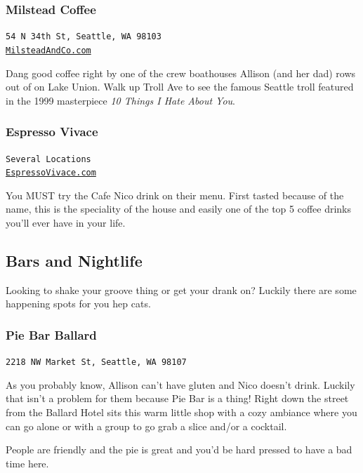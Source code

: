 \documentclass[10pt]{article}
\begin{document}
\subsubsection{Milstead Coffee}
\begin{center}
    \texttt{54 N 34th St, Seattle, WA 98103\\\href{http://milsteadandco.com/}{MilsteadAndCo.com}}
\end{center}
Dang good coffee right by one of the crew boathouses Allison (and her dad) rows out of on Lake Union. 
Walk up Troll Ave to see the famous Seattle troll featured in the 1999 masterpiece \textit{10 Things I Hate About You}.

\subsubsection{Espresso Vivace}
\begin{center}
    \texttt{Several Locations\\\href{http://espressovivace.com/}{EspressoVivace.com}}
\end{center}
You MUST try the Cafe Nico drink on their menu. First tasted because of the name, this is the speciality of 
the house and easily one of the top 5 coffee drinks you'll ever have in your life.

\newpage
\noindent\hrulefill 

\subsection{Bars and Nightlife}
Looking to shake your groove thing or get your drank on? Luckily there are some happening
spots for you hep cats.
\subsubsection{Pie Bar Ballard}
\begin{center}
    \texttt{2218 NW Market St, Seattle, WA 98107}
\end{center}

As you probably know, Allison can't have gluten and Nico doesn't drink. Luckily that isn't a problem 
for them because Pie Bar is a thing! Right down the street from the Ballard Hotel sits this warm
little shop with a cozy ambiance where you can go alone or with a group to go grab a slice and/or a cocktail.

People are friendly and the pie is great and you'd be hard pressed to have a bad time here.
\end{document}
